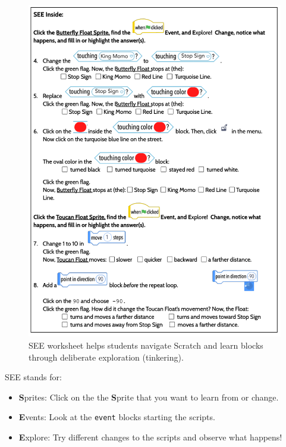 \documentclass[sigconf,manuscript,review,anonymous]{acmart} %
\begin{document}
\begin{figure}[h]
    \centering
    \includegraphics[width=.6\linewidth]{examples/SEE_Example.png}
    \caption{SEE worksheet helps students navigate Scratch and learn blocks through deliberate exploration (tinkering).}
    \label{fig:see}
\end{figure}

SEE stands for:
\begin{itemize}
    \item \textbf{S}prites: Click on the the \textbf{S}prite that you want to learn from or change.
    \item \textbf{E}vents: Look at the \texttt{event} blocks starting the scripts.
    \item \textbf{E}xplore: Try different changes to the scripts and observe what happens!
\end{itemize}
\end{document}
